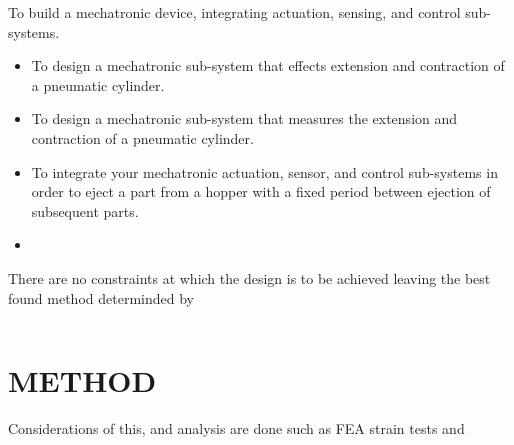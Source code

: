 \documentclass[a4paper, 10pt]{article}
\begin{document}
To build a mechatronic device, integrating actuation, sensing, and control sub-systems.

\begin{itemize}
	\item To design a mechatronic sub-system that effects extension and contraction of a pneumatic cylinder.
	\item To design a mechatronic sub-system that measures the extension and contraction of a pneumatic cylinder.
	\item To integrate your mechatronic actuation, sensor, and control sub-systems in order to eject a part from a hopper with a fixed period between ejection of subsequent parts.
	\item 
\end{itemize}

There are no constraints at which the design is to be achieved leaving the best found method determinded by 


\begin{lstlisting}[language = C++]

\end{lstlisting}


\section{METHOD}

Considerations of this, and analysis are done such as FEA strain tests and 
\end{document}
